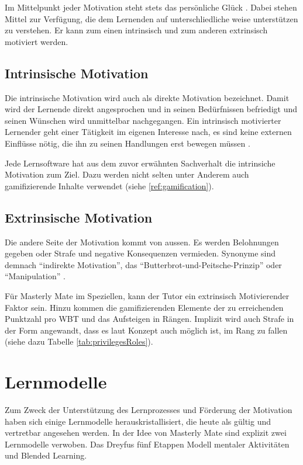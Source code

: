 Im Mittelpunkt jeder Motivation steht stets das persönliche Glück
\cite{stampfl:2012}. Dabei stehen Mittel zur Verfügung, die dem Lernenden auf
unterschliedliche weise unterstützen zu verstehen. Er kann zum einen
intrinsisch und zum anderen extrinsisch motiviert werden.

\subsection{Intrinsische Motivation}\label{ref:intrinsischeMotivation}
Die intrinsische Motivation wird auch als direkte Motivation bezeichnet. Damit
wird der Lernende direkt angesprochen und in seinen Bedürfnissen befriedigt und
seinen Wünschen wird unmittelbar nachgegangen. Ein intrinsisch motivierter
Lernender geht einer Tätigkeit im eigenen Interesse nach, es sind keine externen
Einflüsse nötig, die ihn zu seinen Handlungen erst bewegen müssen
\cite{jacobs:2010}.

Jede Lernsoftware hat aus dem zuvor erwähnten Sachverhalt die intrinsiche
Motivation zum Ziel. Dazu werden nicht selten unter Anderem auch gamifizierende
Inhalte verwendet (siehe \ref{ref:gamification}).

\subsection{Extrinsische Motivation}\label{ref:extrinsischeMotivation}
Die andere Seite der Motivation kommt von aussen. Es werden Belohnungen gegeben
oder Strafe und negative Konsequenzen vermieden. Synonyme sind demnach
"`indirekte Motivation"', das "`Butterbrot-und-Peitsche-Prinzip"' oder
"`Manipulation"' \cite{jacobs:2010}.

Für Masterly Mate im Speziellen, kann der Tutor ein extrinsisch Motivierender
Faktor sein. Hinzu kommen die gamifizierenden Elemente der zu erreichenden
Punktzahl pro WBT und das Aufsteigen in Rängen. Implizit wird auch Strafe in der
Form angewandt, dass es laut Konzept auch möglich ist, im Rang zu fallen
(siehe dazu Tabelle \ref{tab:privilegesRoles}).

\section{Lernmodelle}
Zum Zweck der Unterstützung des Lernprozesses und Förderung der Motivation haben
sich einige Lernmodelle herauskristallisiert, die heute als gültig und
vertretbar angesehen werden. In der Idee von Masterly Mate sind explizit zwei
Lernmodelle verwoben. Das Dreyfus fünf Etappen Modell mentaler Aktivitäten und
Blended Learning.

